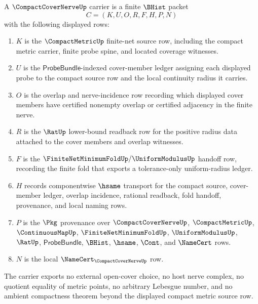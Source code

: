 \begin{definition}
\label{def:compact-cover-nerve-carrier}
A $\CompactCoverNerveUp$ carrier is a finite $\BHist$ packet
$$
C=(K,U,O,R,F,H,P,N)
$$
with the following displayed rows:
\begin{enumerate}
\item $K$ is the $\CompactMetricUp$ finite-net source row, including the compact metric carrier, finite probe spine, and located coverage witnesses.
\item $U$ is the $\mathsf{ProbeBundle}$-indexed cover-member ledger assigning each displayed probe to the compact source row and the local continuity radius it carries.
\item $O$ is the overlap and nerve-incidence row recording which displayed cover members have certified nonempty overlap or certified adjacency in the finite nerve.
\item $R$ is the $\RatUp$ lower-bound readback row for the positive radius data attached to the cover members and overlap witnesses.
\item $F$ is the $\FiniteNetMinimumFoldUp/\UniformModulusUp$ handoff row, recording the finite fold that exports a tolerance-only uniform-radius ledger.
\item $H$ records componentwise $\hsame$ transport for the compact source, cover-member ledger, overlap incidence, rational readback, fold handoff, provenance, and local naming rows.
\item $P$ is the $\Pkg$ provenance over $\CompactCoverNerveUp$, $\CompactMetricUp$, $\ContinuousMapUp$, $\FiniteNetMinimumFoldUp$, $\UniformModulusUp$, $\RatUp$, $\mathsf{ProbeBundle}$, $\BHist$, $\hsame$, $\Cont$, and $\NameCert$ rows.
\item $N$ is the local $\NameCert_{\CompactCoverNerveUp}$ row.
\end{enumerate}
The carrier exports no external open-cover choice, no host nerve complex, no quotient equality of metric points, no arbitrary Lebesgue number, and no ambient compactness theorem beyond the displayed compact metric source row.
\end{definition}

